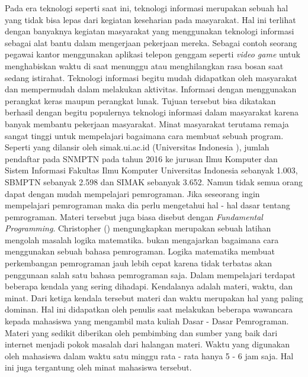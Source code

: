Pada era teknologi seperti saat ini, teknologi informasi merupakan sebuah hal yang tidak bisa lepas dari kegiatan keseharian pada masyarakat. Hal ini terlihat dengan banyaknya kegiatan masyarakat yang menggunakan teknologi informasi sebagai alat bantu dalam mengerjaan pekerjaan mereka. Sebagai contoh seorang pegawai kantor menggunakan aplikasi telepon genggam seperti \textit{video game} untuk menghabiskan waktu di saat menunggu atau menghilangkan rasa bosan saat sedang istirahat.
\linebreak
\linebreak
Teknologi informasi begitu mudah didapatkan oleh masyarakat dan mempermudah dalam melakukan aktivitas. Informasi dengan menggunakan perangkat keras maupun perangkat lunak. Tujuan tersebut bisa dikatakan berhasil dengan begitu populernya teknologi informasi dalam masyarakat karena banyak membantu pekerjaan masyarakat.
\linebreak\linebreak
Minat masyarakat terutama remaja sangat tinggi untuk mempelajari bagaimana cara membuat sebuah program. Seperti yang dilansir oleh simak.ui.ac.id (Universitas Indonesia \citeyear{article.simak}), jumlah pendaftar pada SNMPTN pada tahun 2016 ke jurusan Ilmu Komputer dan Sistem Informasi Fakultas Ilmu Komputer Universitas Indonesia sebanyak 1.003, SBMPTN sebanyak 2.598 dan SIMAK sebanyak 3.652. Namun tidak semua orang dapat dengan mudah mempelajari pemrograman. Jika seseorang ingin mempelajari pemrograman maka dia perlu mengetahui hal - hal dasar tentang pemrograman. Materi tersebut juga biasa disebut dengan \textit{Fundamental Programming}.
\linebreak\linebreak
Christopher (\citeyear{paper.christoper}) mengungkapkan \ddp merupakan sebuah latihan mengolah masalah logika matematika. \DDP bukan mengajarkan bagaimana cara menggunakan sebuah bahasa pemrograman. Logika matematika membuat perkembangan pemrograman jauh lebih cepat karena tidak terbatas akan penggunaan salah satu bahasa pemrograman saja.
\linebreak\linebreak
Dalam mempelajari \ddp terdapat beberapa kendala yang sering dihadapi. Kendalanya adalah materi, waktu, dan minat. Dari ketiga kendala tersebut materi dan waktu merupakan hal yang paling dominan. Hal ini didapatkan oleh penulis saat melakukan beberapa wawancara kepada mahasiswa yang mengambil mata kuliah Dasar - Dasar Pemrograman. Materi yang sedikit diberikan oleh pembimbing dan sumber yang baik dari internet menjadi pokok masalah dari halangan materi. Waktu yang digunakan oleh mahasiswa dalam waktu satu minggu rata - rata hanya 5 - 6 jam saja. Hal ini juga tergantung oleh minat mahasiswa tersebut.
